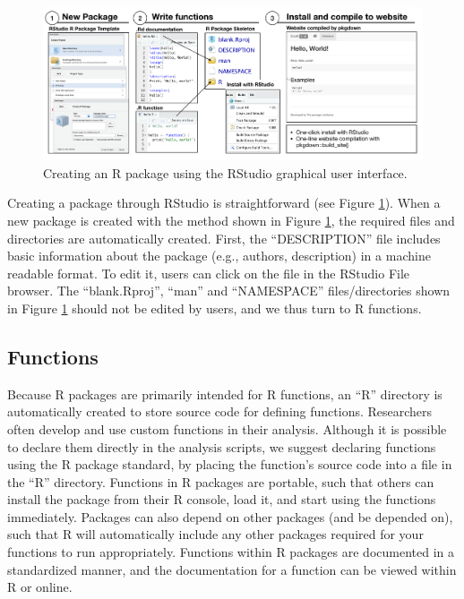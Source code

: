 \documentclass[
  english,
  jou,floatsintext]{apa6}
\begin{document}
\begin{figure}

{\centering \includegraphics[width=\textwidth]{images/r-package-skeleton} 

}

\caption{Creating an R package using the RStudio graphical user interface.}\label{fig:creating-package-rstudio}
\end{figure}

Creating a package through RStudio is straightforward (see Figure \ref{fig:creating-package-rstudio}). When a new package is created with the method shown in Figure \ref{fig:creating-package-rstudio}, the required files and directories are automatically created. First, the ``DESCRIPTION'' file includes basic information about the package (e.g., authors, description) in a machine readable format. To edit it, users can click on the file in the RStudio File browser. The ``blank.Rproj'', ``man'' and ``NAMESPACE'' files/directories shown in Figure \ref{fig:creating-package-rstudio} should not be edited by users, and we thus turn to R functions.

\hypertarget{functions}{%
\subsection{Functions}\label{functions}}

Because R packages are primarily intended for R functions, an ``R'' directory is automatically created to store source code for defining functions. Researchers often develop and use custom functions in their analysis. Although it is possible to declare them directly in the analysis scripts, we suggest declaring functions using the R package standard, by placing the function's source code into a file in the ``R'' directory. Functions in R packages are portable, such that others can install the package from their R console, load it, and start using the functions immediately. Packages can also depend on other packages (and be depended on), such that R will automatically include any other packages required for your functions to run appropriately. Functions within R packages are documented in a standardized manner, and the documentation for a function can be viewed within R or online.
\end{document}
